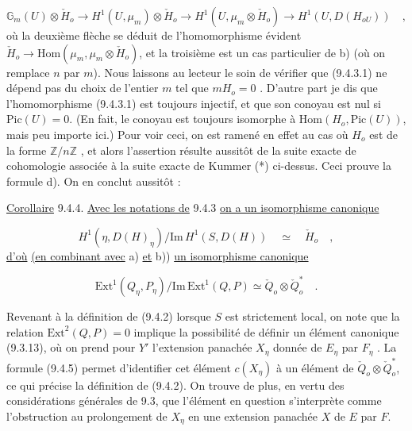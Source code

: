 \begin{equation*}
\mathbb{G}_m(U) \otimes \check{H}_o \longrightarrow H^1(U ,\mu_m) \otimes \check{H}_o \longrightarrow H^1(U,\mu_m \otimes \check{H}_o) \longrightarrow H^1(U, D(H_{oU})) \quad ,
\end{equation*}
où la deuxième flèche se déduit de l'homomorphisme évident $\check{H}_o \longrightarrow \mathrm{Hom}(\mu_m, \mu_m \otimes \check{H}_o)$, et la troisième est un cas particulier de b) (où on remplace $n$ par $m$). Nous laissons au lecteur le soin de vérifier que (9.4.3.1) ne dépend pas du choix de l'entier $m$ tel que $mH_o = 0$ . D'autre part je dis que l'homomorphisme (9.4.3.1) est toujours injectif, et que son conoyau est nul si $\mathrm{Pic}(U) = 0$. (En fait, le conoyau est toujours isomorphe à $\mathrm{Hom}(H_o,\mathrm{Pic}(U))$, mais peu importe ici.) Pour voir ceci, on est ramené en effet au cas où $H_o$ est de la forme $\mathbb{Z}/n\mathbb{Z}$ , et alors l'assertion résulte aussitôt de la suite exacte de cohomologie associée à la suite exacte de Kummer (*) ci-dessus. Ceci prouve la formule d). On en conclut aussitôt :

\underline{Corollaire} 9.4.4. \underline{Avec les notations de} 9.4.3 \underline{on a un isomorphisme canonique}

\begin{equation*}\tag{e)}
H^1(\eta,D(H)_\eta)/ \mathrm{Im}\, H^1(S,D(H)) \quad \simeq \quad \check{H}_o \quad ,
\end{equation*}
\underline{d'où} \underline{(en combinant avec} a) \underline{et} b)) \underline{un isomorphisme canonique}

\begin{equation}\tag{9.4.5}
\mathrm{Ext}^1(Q_\eta,P_\eta)/\mathrm{Im}\, \mathrm{Ext}^1(Q,P) \simeq \check{Q}_o \otimes \check{Q}_o^* \quad .
\end{equation}


Revenant à la définition de (9.4.2) lorsque $S$ est strictement local, on note que la relation $\mathrm{Ext}^2(Q,P) = 0$ implique la possibilité de définir un élément canonique (9.3.13), où on prend pour $Y'$ l'extension panachée $X_\eta$ donnée de $E_\eta$ par $F_\eta$ . La formule (9.4.5) permet d'identifier cet élément $c(X_\eta)$ à un élément de $\check{Q}_o \otimes \check{Q}_o^*$, ce qui précise la définition de (9.4.2). On trouve de plus, en vertu des considérations générales de 9.3, que l'élément en question s'interprète comme l'obstruction au prolongement de $X_\eta$ en une extension panachée $X$ de $E$ par $F$.

